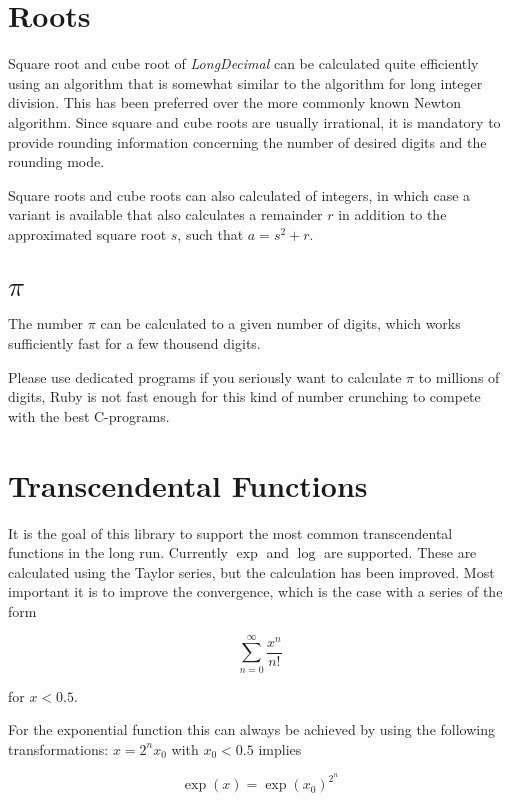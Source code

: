 \documentclass[10pt,a4paper]{article}
\begin{document}
\pagebreak

\section{Roots}

Square root and cube root of {\slshape LongDecimal\/} can be calculated quite
efficiently using an algorithm that is somewhat similar to the
algorithm for long integer division.  This has been preferred over the
more commonly known Newton algorithm.  Since square and cube roots are
usually irrational, it is mandatory to provide rounding information
concerning the number of desired digits and the rounding mode.

Square roots and cube roots can also calculated of integers, in which
case a variant is available that also calculates a remainder $r$ in
addition to the approximated square root $s$, such
that
$a = s^2+r$.

\section{$\pi$}

The number $\pi$ can be calculated to a given number of digits, which
works sufficiently fast for a few thousend digits.

Please use dedicated programs if you seriously want to calculate $\pi$
to millions of digits, Ruby is not fast enough for this kind of number
crunching to compete with the best C-programs.

\pagebreak

\section{Transcendental Functions}

It is the goal of this library to support the most common
transcendental functions in the long run.  Currently $\exp$ and $\log$
are supported.  These are calculated using the Taylor series, but the
calculation has been improved.  Most important it is to improve the
convergence, which is the case with a series of the form

$$\sum_{n=0}^\infty \frac{x^n}{n!}$$

for $x< 0.5$.

For the exponential function this can always be achieved by using the following transformations: $x = 2^n x_0$ with $x_0 < 0.5$ implies

$$\exp(x) = \exp(x_0)^{2^n}$$
\end{document}
